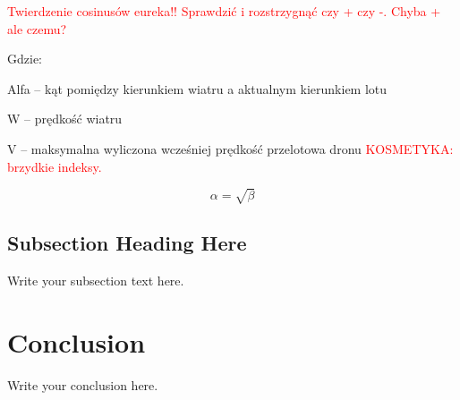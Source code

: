 \documentclass[twoside, 12pt]{article}
\begin{document}
\textcolor{red}{Twierdzenie cosinusów eureka!! Sprawdzić i rozstrzygnąć czy + czy -. Chyba + ale czemu?}
\par Gdzie:
\par Alfa – kąt pomiędzy kierunkiem wiatru a aktualnym kierunkiem lotu
\par W – prędkość wiatru
\par V – maksymalna wyliczona wcześniej prędkość przelotowa dronu
\textcolor{red}{KOSMETYKA: brzydkie indeksy.}
























\newpage
\begin{equation}
    \label{simple_equation}
    \alpha = \sqrt{ \beta }
\end{equation}

\subsection{Subsection Heading Here}
Write your subsection text here.
\lipsum[1-15]


\section{Conclusion}
Write your conclusion here.
\end{document}
